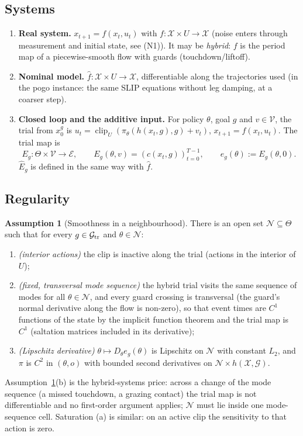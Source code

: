 \documentclass[11pt]{article}
\theoremstyle{definition}
\newtheorem{assumption}{Assumption}
\theoremstyle{remark}
\newcommand{\cV}{\mathcal{V}}
\newcommand{\cE}{\mathcal{E}}
\newcommand{\cG}{\mathcal{G}}
\newcommand{\cX}{\mathcal{X}}
\newcommand{\cN}{\mathcal{N}}
\newcommand{\fhat}{\widehat f}
\newcommand{\Ehat}{\widehat E}
\begin{document}
\subsection{Systems}
\begin{enumerate}[label=(D\arabic*),leftmargin=3em]
\item \textbf{Real system.} $x_{t+1}=f(x_t,u_t)$ with $f:\cX\times U\to\cX$ (noise enters through measurement and initial
  state, see (N1)). It may be \emph{hybrid}: $f$ is the period map of a piecewise-smooth flow with guards
  (touchdown/liftoff).
\item \textbf{Nominal model.} $\fhat:\cX\times U\to\cX$, differentiable along the trajectories used (in the pogo
  instance: the same SLIP equations without leg damping, at a coarser step).
\item \textbf{Closed loop and the additive input.} For policy $\theta$, goal $g$ and $v\in\cV$, the trial from
  $x_0^g$ is $u_t=\operatorname{clip}_U(\pi_\theta(h(x_t,g),g)+v_t)$, $x_{t+1}=f(x_t,u_t)$. The trial map is
  \[E_g:\Theta\times\cV\to\cE,\qquad E_g(\theta,v)=(c(x_t,g))_{t=0}^{T-1},\qquad e_g(\theta):=E_g(\theta,0).\]
  $\Ehat_g$ is defined in the same way with $\fhat$.
\end{enumerate}

\subsection{Regularity}
\begin{assumption}[Smoothness in a neighbourhood]\label{as:smooth}
There is an open set $\cN\subseteq\Theta$ such that for every $g\in\cG_{\rm tr}$ and $\theta\in\cN$:
\begin{enumerate}[label=(\alph*)]
\item \emph{(interior actions)} the clip is inactive along the trial (actions in the interior of $U$);
\item \emph{(fixed, transversal mode sequence)} the hybrid trial visits the same sequence of modes for all
  $\theta\in\cN$, and every guard crossing is transversal (the guard's normal derivative along the flow is non-zero), so
  that event times are $C^1$ functions of the state by the implicit function theorem and the trial map is $C^1$
  (saltation matrices included in its derivative);
\item \emph{(Lipschitz derivative)} $\theta\mapsto D_\theta e_g(\theta)$ is Lipschitz on $\cN$ with constant $L_2$, and
  $\pi$ is $C^2$ in $(\theta,o)$ with bounded second derivatives on $\cN\times h(\cX,\cG)$.
\end{enumerate}
\end{assumption}
Assumption~\ref{as:smooth}(b) is the hybrid-systems price: across a change of the mode sequence (a missed touchdown, a
grazing contact) the trial map is not differentiable and no first-order argument applies; $\cN$ must lie inside one
mode-sequence cell. Saturation (a) is similar: on an active clip the sensitivity to that action is zero.
\end{document}
